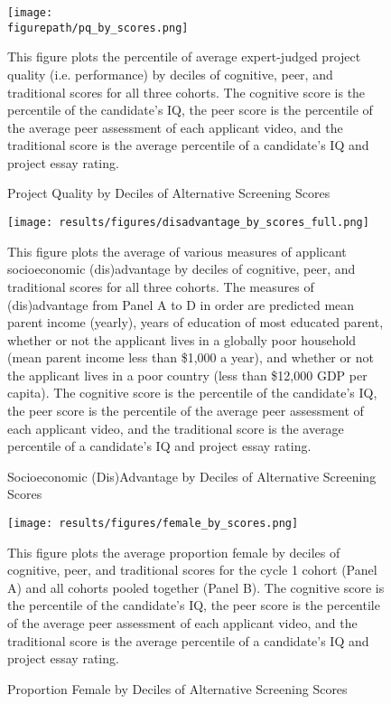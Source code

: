     \newpage
    \begin{figure}[!htb]
    \centering
        \caption{Project Quality by Deciles of Alternative Screening Scores} \label{fig:alt_talent_dist_full}
      \texttt{[image: \\figurepath/pq\_by\_scores.png]} 
        \begin{notes}
        This figure plots the percentile of average expert-judged project quality (i.e. performance) by deciles of cognitive, peer, and traditional scores for all three cohorts. The cognitive score is the percentile of the candidate's IQ, the peer score is the percentile of the average peer assessment of each applicant video, and the traditional score is the average percentile of a candidate's IQ and project essay rating.   
        \end{notes}
    \end{figure}
    
    \newpage
    \begin{figure}[!htb]
    \centering
        \caption{Socioeconomic (Dis)Advantage by Deciles of Alternative Screening Scores} \label{fig:disadvantage_corr_full}
      \texttt{[image: results/figures/disadvantage\_by\_scores\_full.png]} 
        \begin{notes}
        This figure plots the average of various measures of applicant socioeconomic (dis)advantage by deciles of cognitive, peer, and traditional scores for all three cohorts. The measures of (dis)advantage from Panel A to D in order are predicted mean parent income (yearly), years of education of most educated parent, whether or not the applicant lives in a globally poor household (mean parent income less than \$1,000 a year), and whether or not the applicant lives in a poor country (less than \$12,000 GDP per capita). The cognitive score is the percentile of the candidate's IQ, the peer score is the percentile of the average peer assessment of each applicant video, and the traditional score is the average percentile of a candidate's IQ and project essay rating.   
        \end{notes}
    \end{figure}
    
    \newpage
    \begin{figure}[!htb]
    \centering
        \caption{Proportion Female by Deciles of Alternative Screening Scores} \label{fig:alt_female_cor}
      \texttt{[image: results/figures/female\_by\_scores.png]} 
        \begin{notes}
        This figure plots the average proportion female by deciles of cognitive, peer, and traditional scores for the cycle 1 cohort (Panel A) and all cohorts pooled together (Panel B). The cognitive score is the percentile of the candidate's IQ, the peer score is the percentile of the average peer assessment of each applicant video, and the traditional score is the average percentile of a candidate's IQ and project essay rating.   
        \end{notes}
    \end{figure}
    
